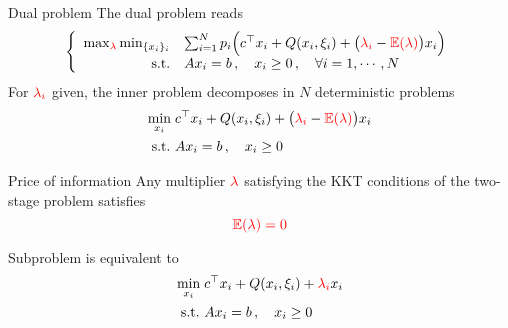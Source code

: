 \begin{frame}{Dual problem}
  The dual problem reads
  \begin{equation*}
    \left\{ \begin{array}{rll} \max_{{\color{red}\lambda}}\min_{\{x_i\}_i}  & \sum_{i=1}^N p_i \Big(c^\top x_i +
          Q(x_i,\xi_i)  + \big({\color{red}\lambda_i} - {\color{red}\mathbb{E}(\lambda)}\big) x_i \Big) \\
  \mbox{s.t.} & Ax_i=b\,, \quad x_i\geq0\,,\quad \forall i =1,\cdots,N
  \end{array} \right.
  \end{equation*}
  For ${\color{red}\lambda_i}$ given, the inner problem decomposes in $N$ deterministic problems
  \begin{equation*}
    \begin{aligned}
      \min_{x_i} \; & c^\top x_i + Q(x_i, \xi_i) + \big({\color{red}\lambda_i} - {\color{red}\mathbb{E}(\lambda)}\big)x_i \\
      \mbox{s.t.}~ & A x_i = b\, , \quad x_i \geq 0
    \end{aligned}
  \end{equation*}

  \begin{block}{Price of information}
    Any multiplier ${\color{red}\lambda}$ satisfying the KKT conditions of the
    two-stage problem satisfies
    \begin{equation*}
      {\color{red}\mathbb{E}(\lambda) = 0}
    \end{equation*}
  \end{block}
  Subproblem is equivalent to
  \begin{equation*}
    \begin{aligned}
      \min_{x_i} \; & c^\top x_i + Q(x_i, \xi_i) + {\color{red}\lambda_i}x_i \\
      \mbox{s.t.}~ & A x_i = b\, , \quad x_i \geq 0
    \end{aligned}
  \end{equation*}

\end{frame}

